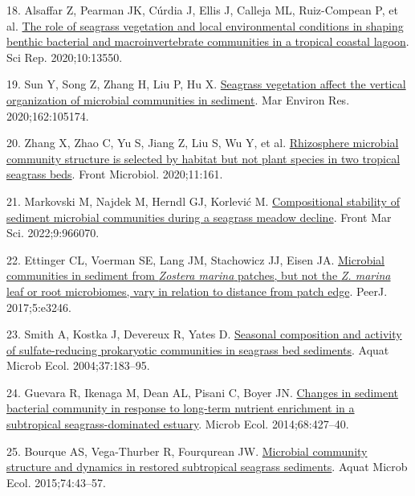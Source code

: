 \documentclass[
  12 pt,
]{article}
\newlength{\cslhangindent}
\newlength{\cslentryspacingunit} %
\newenvironment{CSLReferences}[2] %
 {%
  \setlength{\parindent}{0pt}
  \ifodd #1
  \let\oldpar\par
  \def\par{\hangindent=\cslhangindent\oldpar}
  \fi
  \setlength{\parskip}{#2\cslentryspacingunit}
 }%
 {}
\begin{document}
\begin{CSLReferences}{0}{0}
\leavevmode{}%
18. Alsaffar Z, Pearman JK, Cúrdia J, Ellis J, Calleja ML, Ruiz-Compean P, et al. \href{https://doi.org/10.1038/s41598-020-70318-1}{The role of seagrass vegetation and local environmental conditions in shaping benthic bacterial and macroinvertebrate communities in a tropical coastal lagoon}. Sci Rep. 2020;10:13550.

\leavevmode{}%
19. Sun Y, Song Z, Zhang H, Liu P, Hu X. \href{https://doi.org/10.1016/j.marenvres.2020.105174}{Seagrass vegetation affect the vertical organization of microbial communities in sediment}. Mar Environ Res. 2020;162:105174.

\leavevmode{}%
20. Zhang X, Zhao C, Yu S, Jiang Z, Liu S, Wu Y, et al. \href{https://doi.org/10.3389/fmicb.2020.00161}{Rhizosphere microbial community structure is selected by habitat but not plant species in two tropical seagrass beds}. Front Microbiol. 2020;11:161.

\leavevmode{}%
21. Markovski M, Najdek M, Herndl GJ, Korlević M. \href{https://doi.org/10.3389/fmars.2022.966070}{Compositional stability of sediment microbial communities during a seagrass meadow decline}. Front Mar Sci. 2022;9:966070.

\leavevmode{}%
22. Ettinger CL, Voerman SE, Lang JM, Stachowicz JJ, Eisen JA. \href{https://doi.org/10.7717/peerj.3246}{Microbial communities in sediment from {{\emph{Zostera marina}}} patches, but not the {{\emph{Z. marina}}} leaf or root microbiomes, vary in relation to distance from patch edge}. PeerJ. 2017;5:e3246.

\leavevmode{}%
23. Smith A, Kostka J, Devereux R, Yates D. \href{https://doi.org/10.3354/ame037183}{Seasonal composition and activity of sulfate-reducing prokaryotic communities in seagrass bed sediments}. Aquat Microb Ecol. 2004;37:183--95.

\leavevmode{}%
24. Guevara R, Ikenaga M, Dean AL, Pisani C, Boyer JN. \href{https://doi.org/10.1007/s00248-014-0418-1}{Changes in sediment bacterial community in response to long-term nutrient enrichment in a subtropical seagrass-dominated estuary}. Microb Ecol. 2014;68:427--40.

\leavevmode{}%
25. Bourque AS, Vega-Thurber R, Fourqurean JW. \href{https://doi.org/10.3354/ame01725}{Microbial community structure and dynamics in restored subtropical seagrass sediments}. Aquat Microb Ecol. 2015;74:43--57.


\end{CSLReferences}
\end{document}
